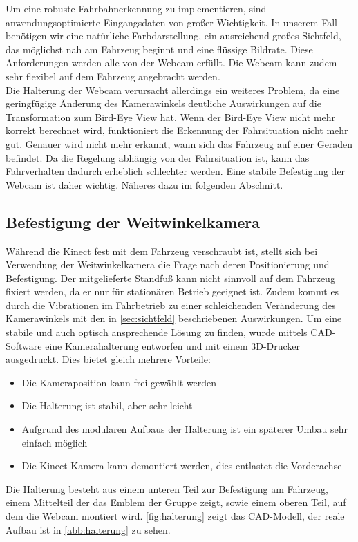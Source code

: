 Um eine robuste Fahrbahnerkennung zu implementieren, sind anwendungsoptimierte Eingangsdaten von großer Wichtigkeit.
In unserem Fall benötigen wir eine natürliche Farbdarstellung, ein ausreichend großes Sichtfeld, das möglichst nah am Fahrzeug beginnt und eine flüssige Bildrate. 
Diese Anforderungen werden alle von der Webcam erfüllt.
Die Webcam kann zudem sehr flexibel auf dem Fahrzeug angebracht werden.
\\
Die Halterung der Webcam verursacht allerdings ein weiteres Problem, da eine geringfügige Änderung des Kamerawinkels deutliche Auswirkungen auf die Transformation zum Bird-Eye View hat.
Wenn der Bird-Eye View nicht mehr korrekt berechnet wird, funktioniert die Erkennung der Fahrsituation nicht mehr gut.
Genauer wird nicht mehr erkannt, wann sich das Fahrzeug auf einer Geraden befindet.
Da die Regelung abhängig von der Fahrsituation ist, kann das Fahrverhalten dadurch erheblich schlechter werden. Eine stabile Befestigung der Webcam ist daher wichtig. Näheres dazu im folgenden Abschnitt.

\subsection{Befestigung der Weitwinkelkamera}
\label{sec:befestigung}
Während die Kinect fest mit dem Fahrzeug verschraubt ist, stellt sich bei Verwendung der Weitwinkelkamera die Frage nach deren Positionierung und Befestigung. Der mitgelieferte Standfuß kann nicht sinnvoll auf dem Fahrzeug fixiert werden, da er nur für stationären Betrieb geeignet ist. Zudem kommt es durch die Vibrationen im Fahrbetrieb zu einer schleichenden Veränderung des Kamerawinkels mit den in \autoref{sec:sichtfeld} beschriebenen Auswirkungen.
Um eine stabile und auch optisch ansprechende Lösung zu finden, wurde mittels CAD-Software eine Kamerahalterung entworfen und mit einem 3D-Drucker ausgedruckt. Dies bietet gleich mehrere Vorteile:

\begin{itemize}
	\item Die Kameraposition kann frei gewählt werden
	\item Die Halterung ist stabil, aber sehr leicht
	\item Aufgrund des modularen Aufbaus der Halterung ist ein späterer Umbau sehr einfach möglich
	\item Die Kinect Kamera kann demontiert werden, dies entlastet die Vorderachse
\end{itemize}

Die Halterung besteht aus einem unteren Teil zur Befestigung am Fahrzeug, einem Mittelteil der das Emblem der Gruppe zeigt, sowie einem oberen Teil, auf dem die Webcam montiert wird. \autoref{fig:halterung} zeigt das CAD-Modell, der reale Aufbau ist in \autoref{abb:halterung} zu sehen.

